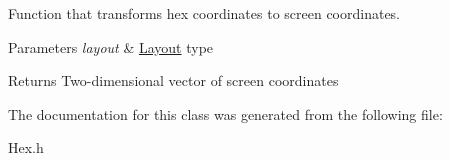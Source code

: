 Function that transforms hex coordinates to screen coordinates. 


\begin{DoxyParams}{Parameters}
{\em layout} & \hyperlink{structLayout}{Layout} type \\
\hline
\end{DoxyParams}
\begin{DoxyReturn}{Returns}
Two-\/dimensional vector of screen coordinates 
\end{DoxyReturn}


The documentation for this class was generated from the following file\+:\begin{DoxyCompactItemize}
\item 
Hex.\+h\end{DoxyCompactItemize}
